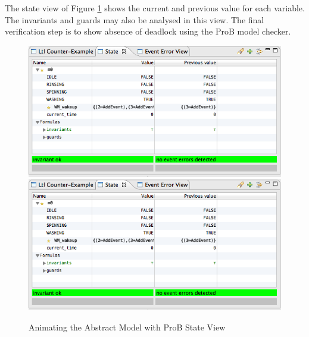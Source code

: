 The state view of Figure \ref{fig:AnimatingTheAbstractModelWithProBStateView} shows the current and previous value for each variable. The invariants and guards may also be analysed in this view. The final verification step is to show absence of deadlock using the ProB model checker.

 \begin{figure}[!htbp]
  \centering
  \ifplastex
  \includegraphics[width=1024]{figures/image17.png}
  \else
  \includegraphics[width=1\textwidth]{figures/image17.png}
  \fi
  \caption{Animating the Abstract Model with ProB State View}
  \label{fig:AnimatingTheAbstractModelWithProBStateView}
\end{figure} 

